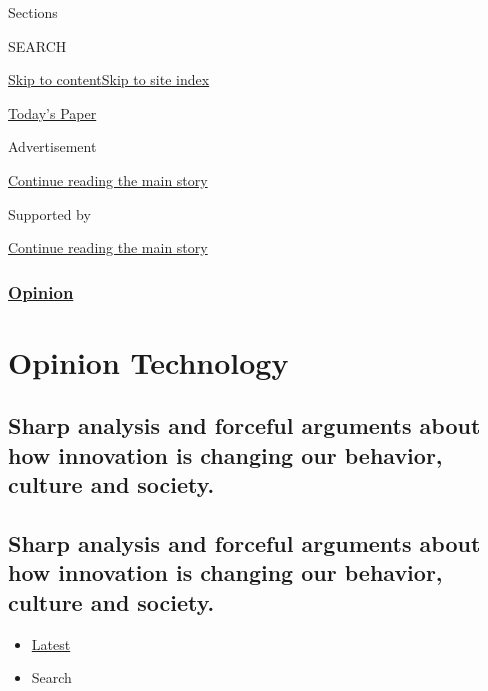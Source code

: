 Sections

SEARCH

\protect\hyperlink{site-content}{Skip to
content}\protect\hyperlink{site-index}{Skip to site index}

\href{https://myaccount.nytimes.com/auth/login?response_type=cookie\&client_id=vi}{}

\href{https://www.nytimes.com/section/todayspaper}{Today's Paper}

Advertisement

\protect\hyperlink{after-top}{Continue reading the main story}

Supported by

\protect\hyperlink{after-sponsor}{Continue reading the main story}

\hypertarget{opinion}{%
\subsubsection{\texorpdfstring{\href{/section/opinion}{Opinion}}{Opinion}}\label{opinion}}

\hypertarget{opinion--technology}{%
\section{Opinion \textbar{} Technology}\label{opinion--technology}}

\hypertarget{sharp-analysis-and-forceful-arguments-about-how-innovation-is-changing-our-behavior-culture-and-society}{%
\subsection{Sharp analysis and forceful arguments about how innovation
is changing our behavior, culture and
society.}\label{sharp-analysis-and-forceful-arguments-about-how-innovation-is-changing-our-behavior-culture-and-society}}

\hypertarget{sharp-analysis-and-forceful-arguments-about-how-innovation-is-changing-our-behavior-culture-and-society-1}{%
\subsection{Sharp analysis and forceful arguments about how innovation
is changing our behavior, culture and
society.}\label{sharp-analysis-and-forceful-arguments-about-how-innovation-is-changing-our-behavior-culture-and-society-1}}

\begin{itemize}
\tightlist
\item
  \protect\hyperlink{stream-panel}{Latest}
\item
  Search
\end{itemize}

